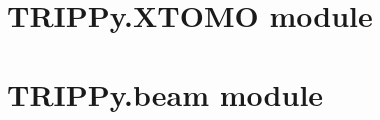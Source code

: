 \documentclass[letterpaper,10pt,english]{sphinxmanual}
\begin{document}
\begin{fulllineitems}
\label{TRIPPy:TRIPPy.NSTX.diode6}
\end{fulllineitems}



\chapter{TRIPPy.XTOMO module}
\label{TRIPPy:trippy-xtomo-module}\label{TRIPPy:module-TRIPPy.XTOMO}

\begin{fulllineitems}
\label{TRIPPy:TRIPPy.XTOMO.XTOMOchip}
\end{fulllineitems}



\chapter{TRIPPy.beam module}
\label{TRIPPy:module-TRIPPy.beam}\label{TRIPPy:trippy-beam-module}
\end{document}

